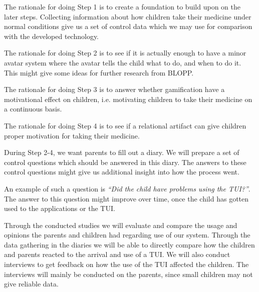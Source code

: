 The rationale for doing Step 1 is to create a foundation to build upon on the later steps. 
Collecting information about how children take their medicine under normal conditions give us a set of control data which we may use for comparison with the developed technology.

The rationale for doing Step 2 is to see if it is actually enough to have a minor avatar system where the avatar tells the child what to do, and when to do it. This might give some ideas for further research from BLOPP. 


The rationale for doing Step 3 is to answer whether gamification have a motivational effect on children, i.e. motivating children to take their medicine on a continuous basis. 

The rationale for doing Step 4 is to see if a relational artifact can give children proper motivation for taking their medicine.

During Step 2-4, we want parents to fill out a diary. We will prepare a set of control questions which should be answered in this diary. The answers to these control questions might give us additional insight into how the process went.  


An example of such a question is \emph{``Did the child have problems using the TUI?''}. The answer to this question might improve over time, once the child has gotten used to the applications or the TUI.  


Through the conducted studies we will evaluate and compare the usage and opinions the parents and children had regarding use of our system. Through the data gathering in the diaries we will be able to directly compare how the children and parents reacted to the arrival and use of a TUI. We will also conduct interviews to get feedback on how the use of the TUI affected the children. The interviews will mainly be conducted on the parents, since small children may not give reliable data.
